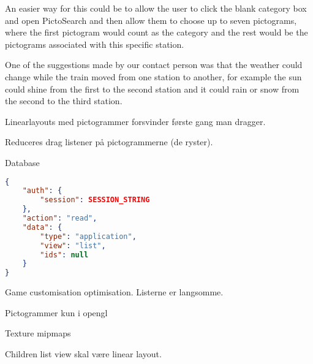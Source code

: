 \begin{description}
An easier way for this could be to allow the user to click the blank category box and open PictoSearch and then allow them to choose up to seven pictograms, where the first pictogram would count as the category and the rest would be the pictograms associated with this specific station.
\item[Changing weather] One of the suggestions made by our contact person was that the weather could change while the train moved from one station to another, for example the sun could shine from the first to the second station and it could rain or snow from the second to the third station. 
\item Linearlayouts med pictogrammer forsvinder første gang man dragger.
\item Reduceres drag listener på pictogrammerne (de ryster).
\item Database  
\begin{lstlisting}[language=json,firstnumber=1,caption={JSON guery to read application data},label=lst:jsonread]
{
	"auth": {
		"session": SESSION_STRING
	},
	"action": "read",
	"data": {
		"type": "application",
		"view": "list",
		"ids": null
	}
}
\end{lstlisting} 

\item Game customisation optimisation. Listerne er langsomme.
\item Pictogrammer kun i opengl
\item Texture mipmaps
\item Children list view skal være linear layout.


\end{description}
